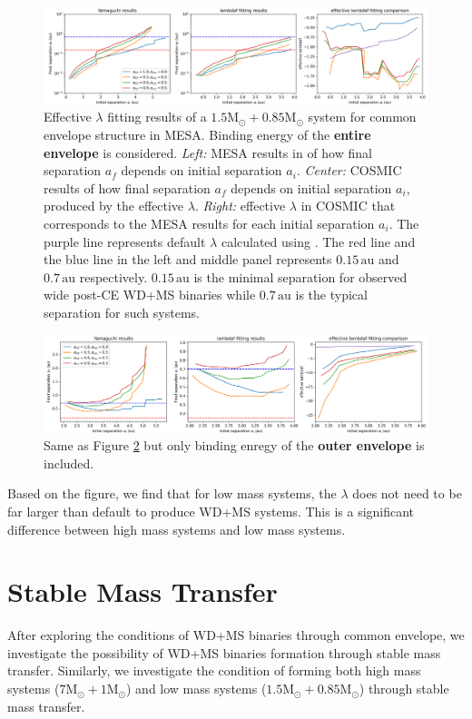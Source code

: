 \documentclass[12pt]{article}
\newcommand{\Msun}{\mathrm{M_{\odot}}}
\newcommand{\au}{\, \mathrm{au}}
\begin{document}
\begin{figure}
    \centering
    \includegraphics[width=\linewidth]{fig/1.5+0.8cmp_whole.png}
    \caption{Effective $\lambda$ fitting results of a $1.5\Msun + 0.85\Msun$ system for common envelope structure in MESA. Binding energy of the \textbf{entire envelope} is considered. \emph{Left:} MESA results in \cite{yamaguchi_lo} of how final separation $a_f$ depends on initial separation $a_i$. \emph{Center:} COSMIC results of how final separation $a_f$ depends on initial separation $a_i$, produced by the effective $\lambda$. \emph{Right:} effective $\lambda$ in COSMIC that corresponds to the MESA results for each initial separation $a_i$. The purple line represents default $\lambda$ calculated using \cite{claeys2014theoretical}. The red line and the blue line in the left and middle panel represents $0.15 \au$ and $0.7 \au$ respectively. $0.15 \au$ is the minimal separation for observed wide post-CE WD+MS binaries while $0.7 \au$ is the typical separation for such systems.}
    \label{fit_cmp_lo_whole}
\end{figure}

\begin{figure}
    \centering
    \includegraphics[width=\linewidth]{fig/1.5+0.8cmp_pt.png}
    \caption{Same as Figure \ref{fit_cmp_lo_pt} but only binding enregy of the \textbf{outer envelope} is included.}
    \label{fit_cmp_lo_pt}
\end{figure}

Based on the figure, we find that for low mass systems, the $\lambda$ does not need to be far larger than default to produce WD+MS systems. This is a significant difference between high mass systems and low mass systems.

\section{Stable Mass Transfer}
After exploring the conditions of WD+MS binaries through common envelope, we investigate the possibility of WD+MS binaries formation through stable mass transfer. Similarly, we investigate the condition of forming both high mass systems ($7\Msun + 1\Msun$) and low mass systems ($1.5\Msun + 0.85\Msun$) through stable mass transfer.
\end{document}
